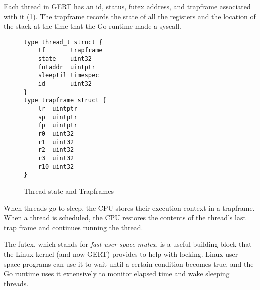 Each thread in GERT has an id, status, futex address, and trapframe associated with it (\ref{fig:threadtrap}).
The trapframe records the state of all the registers and the location of the stack at
the time that the Go runtime made a syscall.

\begin{figure}[h]
  \begin{lstlisting}
type thread_t struct {
	tf       trapframe
	state    uint32
	futaddr  uintptr
	sleeptil timespec
	id       uint32
}
type trapframe struct {
	lr  uintptr
	sp  uintptr
	fp  uintptr
	r0  uint32
	r1  uint32
	r2  uint32
	r3  uint32
	r10 uint32
}
\end{lstlisting}

  \caption{Thread state and Trapframes} \label{fig:threadtrap}
\end{figure}

When threads go to sleep, the CPU stores their execution context in a trapframe.
When a thread is scheduled, the CPU restores the contents of the thread's last trap
frame and continues running the thread.

The futex, which stands for \textit{fast user space mutex}, is a useful building block
that the Linux kernel (and now GERT) provides to help with locking. Linux user space programs can use
it to wait until a certain condition becomes true, and the Go runtime uses it extensively
to monitor elapsed time and wake sleeping threads.





